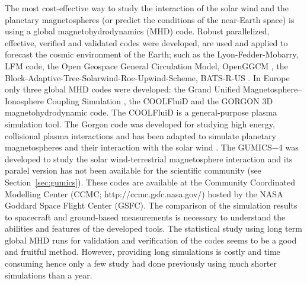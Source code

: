 \documentclass[linenumbers,draft]{agujournal}
\begin{document}
The most cost-effective way to study the interaction of the solar wind and the planetary magnetospheres (or predict the conditions of the near-Earth space) is using a global magnetohydrodynamics (MHD) code. Robust parallelized, effective, verified and validated codes were developed, are used and applied to forecast the cosmic environment of the Earth; such as the Lyon-Fedder-Mobarry, LFM \citep{lyon04:_lyon_fedder_mobar_lfm_mhd} code, the Open Geospace General Circulation Model, OpenGGCM \citep{raeder08:_openg_simul_themis_mission}, the Block-Adaptive-Tree-Solarwind-Roe-Upwind-Scheme, BATS-R-US \citep{powell99:_solut_adapt_upwin_schem_ideal_magnet,toth12:_adapt}. In Europe only three global MHD codes were developed: the Grand Unified Magnetosphere--Ionosphere Coupling Simulation \citep[GUMICS$-$4;][]{janhunen12:_gumic_mhd}, the COOLFluiD \citep{lani12:_coolf_open_comput_platf_aerot} and the GORGON 3D magnetohydrodynamic code. The COOLFluiD is a general-purpose plasma simulation tool. The Gorgon code was developed for studying high energy, collisional plasma interactions and has been adapted to simulate planetary magnetospheres and their interaction with the solar wind \citep{mejnertsen16:_global_mhd_neptun,mejnertsen18:_global_mhd_simul_earth_bow}. The GUMICS$-$4 was developed to study the solar wind-terrestrial magnetosphere interaction and its paralel version has not been available for the scientific community (see Section~\ref{sec:gumics}). These codes are available at the Community Coordinated Modelling Center (CCMC; http://ccmc.gsfc.nasa.gov/) hosted by the NASA Goddard Space Flight Center (GSFC). The comparison of the simulation results to spacecraft and ground-based measurements is necessary to understand the abilities and features of the developed tools. The statistical study using long term global MHD runs for validation and verification of the codes seems to be a good and fruitful method. However, providing long simulations is costly and time consuming hence only a few study had done previously using much shorter simulations than a year. 
\end{document}
